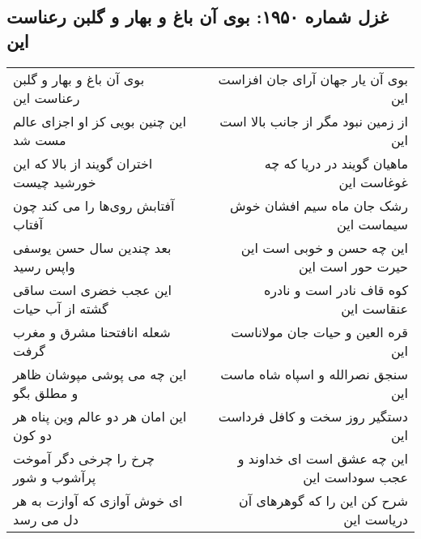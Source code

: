 \begin{center}
\section*{غزل شماره ۱۹۵۰: بوی آن باغ و بهار و گلبن رعناست این}
\label{sec:1950}
\begin{longtable}{l p{0.5cm} r}
بوی آن باغ و بهار و گلبن رعناست این
&&
بوی آن یار جهان آرای جان افزاست این
\\
این چنین بویی کز او اجزای عالم مست شد
&&
از زمین نبود مگر از جانب بالا است این
\\
اختران گویند از بالا که این خورشید چیست
&&
ماهیان گویند در دریا که چه غوغاست این
\\
آفتابش روی‌ها را می کند چون آفتاب
&&
رشک جان ماه سیم افشان خوش سیماست این
\\
بعد چندین سال حسن یوسفی واپس رسید
&&
این چه حسن و خوبی است این حیرت حور است این
\\
این عجب خضری است ساقی گشته از آب حیات
&&
کوه قاف نادر است و نادره عنقاست این
\\
شعله انافتحنا مشرق و مغرب گرفت
&&
قره العین و حیات جان مولاناست این
\\
این چه می پوشی مپوشان ظاهر و مطلق بگو
&&
سنجق نصرالله و اسپاه شاه ماست این
\\
این امان هر دو عالم وین پناه هر دو کون
&&
دستگیر روز سخت و کافل فرداست این
\\
چرخ را چرخی دگر آموخت پرآشوب و شور
&&
این چه عشق است ای خداوند و عجب سوداست این
\\
ای خوش آوازی که آوازت به هر دل می رسد
&&
شرح کن این را که گوهرهای آن دریاست این
\\
\end{longtable}
\end{center}
